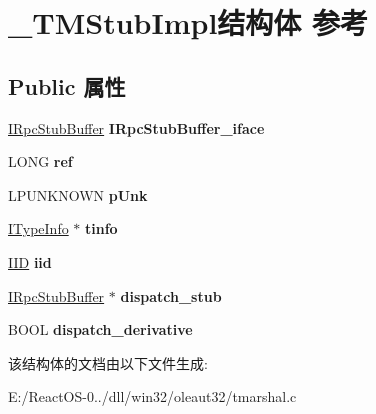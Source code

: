 \hypertarget{struct___t_m_stub_impl}{}\section{\+\_\+\+T\+M\+Stub\+Impl结构体 参考}
\label{struct___t_m_stub_impl}
\subsection*{Public 属性}
\begin{DoxyCompactItemize}
\item 
\mbox{\label{struct___t_m_stub_impl_afcfcc1c40a12ad0e1afd7f34afda818e}} 
\hyperlink{interface_i_rpc_stub_buffer}{I\+Rpc\+Stub\+Buffer} {\bfseries I\+Rpc\+Stub\+Buffer\+\_\+iface}
\item 
\mbox{\label{struct___t_m_stub_impl_a62eba0f00799d947a3d301d361f8368c}} 
L\+O\+NG {\bfseries ref}
\item 
\mbox{\label{struct___t_m_stub_impl_ac042a86bc4b9801856036287f59fb70b}} 
L\+P\+U\+N\+K\+N\+O\+WN {\bfseries p\+Unk}
\item 
\mbox{\label{struct___t_m_stub_impl_ab8aef988ea76dfc0075f6ff2c75958e3}} 
\hyperlink{interface_i_type_info}{I\+Type\+Info} $\ast$ {\bfseries tinfo}
\item 
\mbox{\label{struct___t_m_stub_impl_a0ae506bb32bda00eafba7c42ca813c78}} 
\hyperlink{struct___i_i_d}{I\+ID} {\bfseries iid}
\item 
\mbox{\label{struct___t_m_stub_impl_a0ae593352d47fd24a065359217f49f9c}} 
\hyperlink{interface_i_rpc_stub_buffer}{I\+Rpc\+Stub\+Buffer} $\ast$ {\bfseries dispatch\+\_\+stub}
\item 
\mbox{\label{struct___t_m_stub_impl_a4f0df4febde3044b01a0635d10cc12cf}} 
B\+O\+OL {\bfseries dispatch\+\_\+derivative}
\end{DoxyCompactItemize}


该结构体的文档由以下文件生成\+:\begin{DoxyCompactItemize}
\item 
E\+:/\+React\+O\+S-\/0../dll/win32/oleaut32/tmarshal.\+c\end{DoxyCompactItemize}
